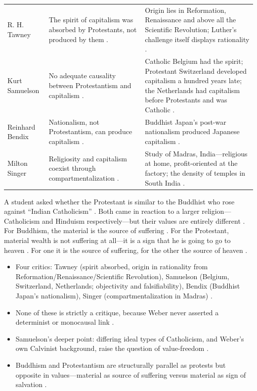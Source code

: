\vspace{6pt}
\noindent
\begin{tabularx}{\textwidth}{>{\hsize}Y >{\hsize}Y >{\hsize}Y}
\toprule
{}
 &  &  \\
\midrule
R. H. Tawney & The spirit of capitalism was absorbed by Protestants, not produced by them . & Origin lies in Reformation, Renaissance and above all the Scientific Revolution; Luther's challenge itself displays rationality . \\
\midrule
Kurt Samuelson & No adequate causality between Protestantism and capitalism . & Catholic Belgium had the spirit; Protestant Switzerland developed capitalism a hundred years late; the Netherlands had capitalism before Protestants and was Catholic . \\
\midrule
Reinhard Bendix & Nationalism, not Protestantism, can produce capitalism . & Buddhist Japan's post-war nationalism produced Japanese capitalism . \\
\midrule
Milton Singer & Religiosity and capitalism coexist through compartmentalization . & Study of Madras, India---religious at home, profit-oriented at the factory; the density of temples in South India . \\
\bottomrule
\end{tabularx}
\vspace{6pt}

\begin{CriticalPoint}
A student asked whether the Protestant is similar to the Buddhist who rose against ``Indian Catholicism'' . Both came in reaction to a larger religion---Catholicism and Hinduism respectively---but their values are entirely different .
For Buddhism, the material is the source of suffering . For the Protestant, material wealth is not suffering at all---it is a sign that he is going to go to heaven . For one it is the source of suffering, for the other the source of heaven .
\end{CriticalPoint}

\begin{QuickRevision}
\begin{itemize}
    \item Four critics: Tawney (spirit absorbed, origin in rationality from Reformation/Renaissance/Scientific Revolution), Samuelson (Belgium, Switzerland, Netherlands; objectivity and falsifiability), Bendix (Buddhist Japan's nationalism), Singer (compartmentalization in Madras) .
    \item None of these is strictly a critique, because Weber never asserted a determinist or monocausal link .
    \item Samuelson's deeper point: differing ideal types of Catholicism, and Weber's own Calvinist background, raise the question of value-freedom .
    \item Buddhism and Protestantism are structurally parallel as protests but opposite in values---material as source of suffering versus material as sign of salvation .
\end{itemize}
\end{QuickRevision}

